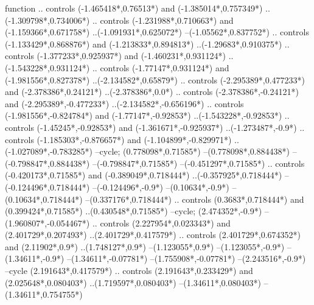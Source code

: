 {\begin{scope}[x=1mm,y=1mm,line width=\SCstroke mm,line cap=round,line join=round]
\begin{SCpart}{function}
.. controls ({-1.465418*\SCF},{0.76513*\SCF}) and ({-1.385014*\SCF},{0.757349*\SCF}) ..({-1.309798*\SCF},{0.734006*\SCF})
.. controls ({-1.231988*\SCF},{0.710663*\SCF}) and ({-1.159366*\SCF},{0.671758*\SCF}) ..({-1.091931*\SCF},{0.625072*\SCF})
--({-1.05562*\SCF},{0.837752*\SCF})
.. controls ({-1.133429*\SCF},{0.868876*\SCF}) and ({-1.213833*\SCF},{0.894813*\SCF}) ..({-1.29683*\SCF},{0.910375*\SCF})
.. controls ({-1.377233*\SCF},{0.925937*\SCF}) and ({-1.460231*\SCF},{0.931124*\SCF}) ..({-1.543228*\SCF},{0.931124*\SCF})
.. controls ({-1.77147*\SCF},{0.931124*\SCF}) and ({-1.981556*\SCF},{0.827378*\SCF}) ..({-2.134582*\SCF},{0.65879*\SCF})
.. controls ({-2.295389*\SCF},{0.477233*\SCF}) and ({-2.378386*\SCF},{0.24121*\SCF}) ..({-2.378386*\SCF},{0.0*\SCF})
.. controls ({-2.378386*\SCF},{-0.24121*\SCF}) and ({-2.295389*\SCF},{-0.477233*\SCF}) ..({-2.134582*\SCF},{-0.656196*\SCF})
.. controls ({-1.981556*\SCF},{-0.824784*\SCF}) and ({-1.77147*\SCF},{-0.92853*\SCF}) ..({-1.543228*\SCF},{-0.92853*\SCF})
.. controls ({-1.45245*\SCF},{-0.92853*\SCF}) and ({-1.361671*\SCF},{-0.925937*\SCF}) ..({-1.273487*\SCF},{-0.9*\SCF})
.. controls ({-1.185303*\SCF},{-0.876657*\SCF}) and ({-1.104899*\SCF},{-0.829971*\SCF}) ..({-1.027089*\SCF},{-0.783285*\SCF})
--cycle;
 ({0.778098*\SCF},{0.71585*\SCF})
--({0.778098*\SCF},{0.884438*\SCF})
--({-0.798847*\SCF},{0.884438*\SCF})
--({-0.798847*\SCF},{0.71585*\SCF})
--({-0.451297*\SCF},{0.71585*\SCF})
.. controls ({-0.420173*\SCF},{0.71585*\SCF}) and ({-0.389049*\SCF},{0.718444*\SCF}) ..({-0.357925*\SCF},{0.718444*\SCF})
--({-0.124496*\SCF},{0.718444*\SCF})
--({-0.124496*\SCF},{-0.9*\SCF})
--({0.10634*\SCF},{-0.9*\SCF})
--({0.10634*\SCF},{0.718444*\SCF})
--({0.337176*\SCF},{0.718444*\SCF})
.. controls ({0.3683*\SCF},{0.718444*\SCF}) and ({0.399424*\SCF},{0.71585*\SCF}) ..({0.430548*\SCF},{0.71585*\SCF})
--cycle;
 ({2.474352*\SCF},{-0.9*\SCF})
--({1.960807*\SCF},{-0.054467*\SCF})
.. controls ({2.227954*\SCF},{0.023343*\SCF}) and ({2.401729*\SCF},{0.207493*\SCF}) ..({2.401729*\SCF},{0.417579*\SCF})
.. controls ({2.401729*\SCF},{0.674352*\SCF}) and ({2.11902*\SCF},{0.9*\SCF}) ..({1.748127*\SCF},{0.9*\SCF})
--({1.123055*\SCF},{0.9*\SCF})
--({1.123055*\SCF},{-0.9*\SCF})
--({1.34611*\SCF},{-0.9*\SCF})
--({1.34611*\SCF},{-0.07781*\SCF})
--({1.755908*\SCF},{-0.07781*\SCF})
--({2.243516*\SCF},{-0.9*\SCF})
--cycle
({2.191643*\SCF},{0.417579*\SCF})
.. controls ({2.191643*\SCF},{0.233429*\SCF}) and ({2.025648*\SCF},{0.080403*\SCF}) ..({1.719597*\SCF},{0.080403*\SCF})
--({1.34611*\SCF},{0.080403*\SCF})
--({1.34611*\SCF},{0.754755*\SCF})

\end{SCpart}
\end{scope}}

